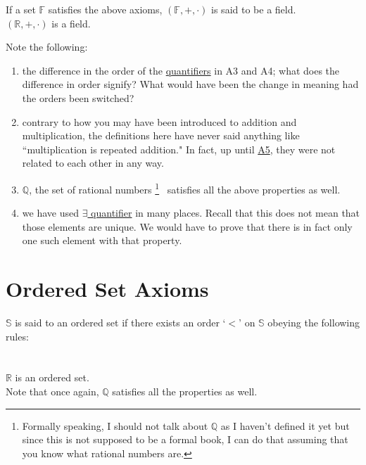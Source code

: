 If a set $\mathbb{F}$ satisfies the above axioms, $(\mathbb{F}, +, \cdot)$ is said to be a field.\\
$(\mathbb{R}, +, \cdot)$ is a field.

\hrulefill
{}

\newpage
Note the following:
\begin{enumerate}
    \itemsep0em
    \item the difference in the order of the \hyperref[sec:quant]{quantifiers} in A3 and A4; what does the difference in order signify? What would have been the change in meaning had the orders been switched?
    \item contrary to how you may have been introduced to addition and multiplication, the definitions here have never said anything like ``multiplication is repeated addition." In fact, up until \hyperref[ax:A5]{A5}, they were not related to each other in any way.
    \item $\mathbb{Q}$, the set of rational numbers%
    \footnote{Formally speaking, I should not talk about $\mathbb{Q}$ as I haven't defined it yet but since this is not supposed to be a formal book, I can do that assuming that you know what rational numbers are.}%
    \ satisfies all the above properties as well.
    \item we have used \hyperref[ssec:exisquant]{$\exists$ quantifier} in many places. Recall that this does not mean that those elements are unique. We would have to prove that there is in fact only one such element with that property.
\end{enumerate}
%
\section{Ordered Set Axioms}\label{sec:oset}
$\mathbb{S}$ is said to an ordered set if there exists an order `$<$' on $\mathbb{S}$ obeying the following rules:
\\
\\~\\
$\mathbb{R}$ is an ordered set.\\
Note that once again, $\mathbb{Q}$ satisfies all the properties as well.

